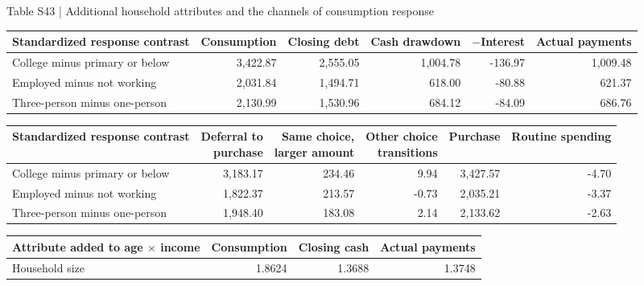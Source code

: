 \documentclass[10pt]{article}
\begin{document}
\clearpage
\begin{center}\begin{minipage}{\textwidth}\fontsize{7.8}{9.5}\selectfont
Table S43 | Additional household attributes and the channels of consumption response
\par\vspace{4pt}
\begin{tabularx}{\textwidth}{@{}Xrrrrr@{}}\toprule
Standardized response contrast & Consumption & Closing debt & Cash drawdown & $-$Interest & Actual payments \\
\midrule
College minus primary or below & 3,422.87 & 2,555.05 & 1,004.78 & -136.97 & 1,009.48 \\

Employed minus not working & 2,031.84 & 1,494.71 & 618.00 & -80.88 & 621.37 \\

Three-person minus one-person & 2,130.99 & 1,530.96 & 684.12 & -84.09 & 686.76 \\

\bottomrule\end{tabularx}
\par\vspace{8pt}
\begin{tabularx}{\textwidth}{@{}Xrrrrr@{}}\toprule
Standardized response contrast & \shortstack[r]{Deferral to\\purchase} & \shortstack[r]{Same choice,\\larger amount} & \shortstack[r]{Other choice\\transitions} & Purchase & Routine spending \\
\midrule
College minus primary or below & 3,183.17 & 234.46 & 9.94 & 3,427.57 & -4.70 \\

Employed minus not working & 1,822.37 & 213.57 & -0.73 & 2,035.21 & -3.37 \\

Three-person minus one-person & 1,948.40 & 183.08 & 2.14 & 2,133.62 & -2.63 \\

\bottomrule\end{tabularx}
\par\vspace{8pt}
\begin{tabularx}{\textwidth}{@{}Xrrr@{}}\toprule
Attribute added to age $\times$ income & Consumption & Closing cash & Actual payments \\
\midrule
Household size & 1.8624 & 1.3688 & 1.3748 \\


\end{tabularx}
\end{minipage}
\end{center}
\end{document}
